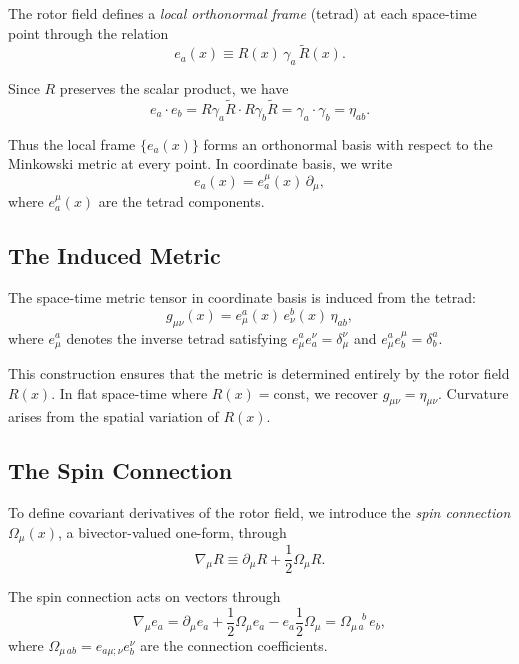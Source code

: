 \documentclass[11pt,a4paper]{article}
\numberwithin{equation}{section}
\theoremstyle{plain}
\theoremstyle{definition}
\theoremstyle{remark}
\begin{document}
The rotor field defines a \emph{local orthonormal frame} (tetrad) at each space-time point through the relation
\begin{equation}
e_a(x) \equiv R(x)\, \gamma_a\, \widetilde{R}(x).
\label{eq:tetrad-def}
\end{equation}

Since $R$ preserves the scalar product, we have
\begin{equation}
e_a \cdot e_b = R\gamma_a\widetilde{R} \cdot R\gamma_b\widetilde{R} = \gamma_a \cdot \gamma_b = \eta_{ab}.
\end{equation}

Thus the local frame $\{e_a(x)\}$ forms an orthonormal basis with respect to the Minkowski metric at every point. In coordinate basis, we write
\begin{equation}
e_a(x) = e_a^\mu(x)\, \partial_\mu,
\end{equation}
where $e_a^\mu(x)$ are the tetrad components.

\subsection{The Induced Metric}

The space-time metric tensor in coordinate basis is induced from the tetrad:
\begin{equation}
g_{\mu\nu}(x) = e_\mu^a(x)\, e_\nu^b(x)\, \eta_{ab},
\label{eq:metric-def}
\end{equation}
where $e_\mu^a$ denotes the inverse tetrad satisfying $e_\mu^a e_a^\nu = \delta_\mu^\nu$ and $e_\mu^a e_b^\mu = \delta_b^a$.

This construction ensures that the metric is determined entirely by the rotor field $R(x)$. In flat space-time where $R(x) = \mathrm{const}$, we recover $g_{\mu\nu} = \eta_{\mu\nu}$. Curvature arises from the spatial variation of $R(x)$.

\subsection{The Spin Connection}

To define covariant derivatives of the rotor field, we introduce the \emph{spin connection} $\Omega_\mu(x)$, a bivector-valued one-form, through
\begin{equation}
\nabla_\mu R \equiv \partial_\mu R + \frac{1}{2}\Omega_\mu R.
\label{eq:spin-connection}
\end{equation}

The spin connection acts on vectors through
\begin{equation}
\nabla_\mu e_a = \partial_\mu e_a + \frac{1}{2}\Omega_\mu e_a - e_a \frac{1}{2}\Omega_\mu = \Omega_{\mu\, a}^{\phantom{\mu a}b}\, e_b,
\end{equation}
where $\Omega_{\mu\, ab} = e_{a\mu;\nu} e_b^\nu$ are the connection coefficients.
\end{document}
